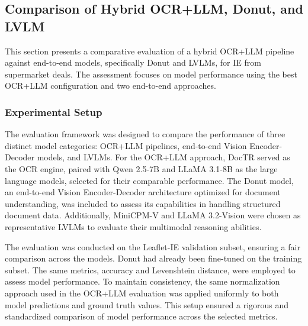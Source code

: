 \documentclass[11pt]{article}
\begin{document}
\subsection{Comparison of Hybrid OCR+LLM, Donut, and LVLM}

This section presents a comparative evaluation of a hybrid OCR+LLM pipeline against end-to-end models, specifically Donut and LVLMs, for IE from supermarket deals. The assessment focuses on model performance using the best OCR+LLM configuration and two end-to-end approaches.

\subsubsection{Experimental Setup}
The evaluation framework was designed to compare the performance of three distinct model categories: OCR+LLM pipelines, end-to-end Vision Encoder-Decoder models, and LVLMs. For the OCR+LLM approach, DocTR served as the OCR engine, paired with Qwen 2.5-7B and LLaMA 3.1-8B as the large language models, selected for their comparable performance. The Donut model, an end-to-end Vision Encoder-Decoder architecture optimized for document understanding, was included to assess its capabilities in handling structured document data. Additionally, MiniCPM-V \cite{yao2024} and LLaMA 3.2-Vision \cite{touvron2023} were chosen as representative LVLMs to evaluate their multimodal reasoning abilities.

The evaluation was conducted on the Leaflet-IE validation subset, ensuring a fair comparison across the models. Donut had already been fine-tuned on the training subset. The same metrics, accuracy and Levenshtein distance, were employed to assess model performance. To maintain consistency, the same normalization approach used in the OCR+LLM evaluation was applied uniformly to both model predictions and ground truth values. This setup ensured a rigorous and standardized comparison of model performance across the selected metrics.
\end{document}

